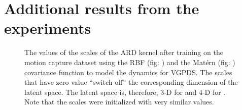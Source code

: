\section{Additional results from the experiments}
\begin{figure}[ht]
\begin{center}
\end{center}
\caption{\small{
The values of the scales of the ARD kernel after training on the motion capture dataset using the RBF (fig: ) and the Mat\'ern (fig: ) covariance function to model the dynamics for VGPDS. The scales that have zero value ``switch off'' the corresponding dimension of the latent space. The latent space is, therefore, 3-D for  and 4-D for . Note that the scales were initialized with very similar values.
}
}
\label{fig:supplMocap1}
\end{figure}


